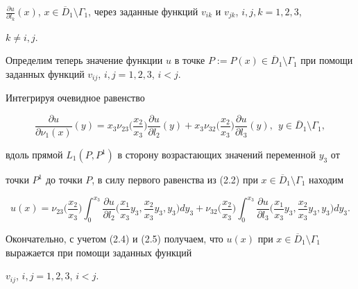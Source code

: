 \begin{pf}
$\frac{\partial u}{\partial l_k}(x)$, $x\in \overline D_1 \setminus


\Gamma_1$, через заданные функций $v_{ik}$ и $v_{jk}$, $i,j,k=1,2,3$,


$k \ne i,j$.





Определим теперь значение функции $u$ в точке $P:=P(x) \in \overline D_1


\setminus \Gamma_1$ при помощи заданных функций $v_{ij}$, $i,j=1,2,3$, $i<j$.


Интегрируя очевидное равенство


$$


\frac{\partial u}{\partial \nu_1(x)}(y)=x_3 \nu_{23} \bigg (\frac{x_2}{x_3}


\bigg )\frac{\partial u}{\partial l_2}(y)+x_3 \nu_{32} \bigg (\frac{x_2}{x_3}


\bigg ) \frac{\partial u}{\partial l_3}(y),\ \ y \in \overline D_1 \setminus


\Gamma_1,


$$


вдоль прямой $L_1(P,P^1)$ в сторону возрастающих значений переменной $y_3$ от


точки $P^1$ до точки $P$, в силу первого равенства из (2.2) при $x \in


\overline D_1 \setminus \Gamma_1$ находим




\begin{equation}


u(x)=\nu_{23} \bigg (\frac{x_2}{x_3} \bigg ) \int_0^{x_3} \frac{ \partial u}


{\partial l_2}\bigg (\frac{x_1}{x_3}y_3,\frac{x_2}{x_3}y_3,y_3\bigg )dy_3+


\nu_{32} \bigg (\frac{x_2}{x_3} \bigg ) \int_0^{x_3} \frac{\partial u}


{\partial l_3}\bigg (\frac{x_1}{x_3}y_3,\frac{x_2}{x_3}y_3,y_3\bigg )dy_3.


\end{equation}





Окончательно, с учетом (2.4) и (2.5) получаем, что $u(x)$ при $ x \in


\overline D_1 \setminus \Gamma_1 $ выражается при помощи заданных функций


$v_{ij}$, $i,j=1,2,3$, $i<j$.


\end{pf}





